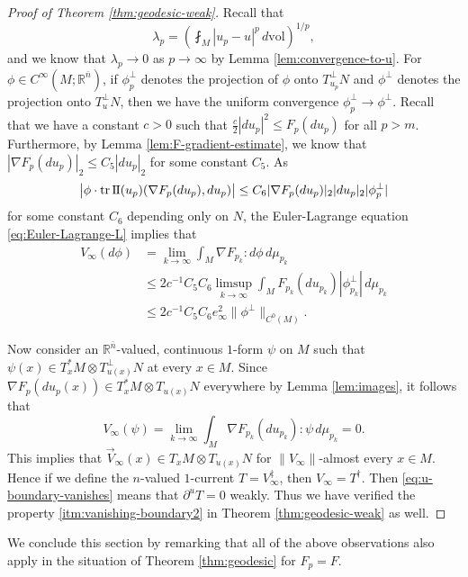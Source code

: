 \documentclass[10pt,a4paper]{amsart}
\newcommand{\R}{\mathbb{R}}
\newcommand{\vol}{\mathrm{vol}}
\newcommand{\ndim}{{\bar{n}}}
\newcommand{\sff}{\mathrm{I{\mkern -1mu}I}}
\DeclareMathOperator{\tr}{tr}
\begin{document}
\begin{proof}[Proof of Theorem \ref{thm:geodesic-weak}]
Recall that
\[
\lambda_p = \left(\fint_M |u_p - u|^p \, d\vol\right)^{1/p},
\]
and we know that $\lambda_p \to 0$ as $p \to \infty$ by Lemma \ref{lem:convergence-to-u}. For $\phi \in C^\infty(M; \R^\ndim)$, if $\phi_p^\perp$ denotes the projection of $\phi$
onto $T_{u_p}^\perp N$ and $\phi^\perp$ denotes the projection onto $T_u^\perp N$,
then we have the uniform convergence $\phi_p^\perp \to \phi^\perp$. Recall
that we have a constant $c > 0$ such that $\frac{c}{2} |du_p|^2 \le F_p(du_p)$ for all $p > m$.
Furthermore, by Lemma \ref{lem:F-gradient-estimate}, we know that $|\nabla F_p(du_p)|_2 \le C_5 |du_p|_2$ for some constant $C_5$. As
\[
\bigl|\phi \cdot \tr \sff(u_p)(\nabla F_p(du_p), du_p)\bigr| \le C_6 |\nabla F_p(du_p)|_2 |du_p|_2 |\phi_p^\perp|
\]
for some constant $C_6$ depending only on $N$, the Euler-Lagrange equation \eqref{eq:Euler-Lagrange-L} implies that
\begin{equation} \label{eq:u-boundary-vanishes}
\begin{split}
V_\infty(d\phi) & = \lim_{k \to \infty} \int_M \nabla F_{p_k} : d\phi \, d\mu_{p_k} \\
& \le 2c^{-1} C_5 C_6 \limsup_{k \to \infty} \int_M F_{p_k}(du_{p_k}) |\phi_{p_k}^\perp| \, d\mu_{p_k} \\
& \le 2c^{-1} C_5 C_6 e_\infty^2 \|\phi^\perp\|_{C^0(M)}.
\end{split}
\end{equation}

Now consider an $\R^\ndim$-valued, continuous $1$-form $\psi$ on $M$ such that $\psi(x) \in T_x^* M \otimes T_{u(x)}^\perp N$ at every $x \in M$. Since $\nabla F_p(du_p(x)) \in T_x^* M \otimes T_{u(x)} N$ everywhere by Lemma \ref {lem:images},
it follows that
\[
V_\infty(\psi) = \lim_{k \to \infty} \int_M \nabla F_{p_k}(du_{p_k}) : \psi \, d\mu_{p_k} = 0.
\]
This implies that $\vec{V}_\infty(x) \in T_x M \otimes T_{u(x)} N$ for $\|V_\infty\|$-almost every $x \in M$. Hence if we define the $n$-valued $1$-current $T = V^\ddagger_\infty$, then $V_\infty = T^\dagger$. 
Then \eqref{eq:u-boundary-vanishes} means that
$\partial^u T = 0$ weakly.
Thus we have verified the property \ref{itm:vanishing-boundary2} in Theorem \ref{thm:geodesic-weak} as well.
\end{proof}


We conclude this section by remarking that all of the above observations also apply
in the situation of Theorem \ref{thm:geodesic} for $F_p = F$.
\end{document}
